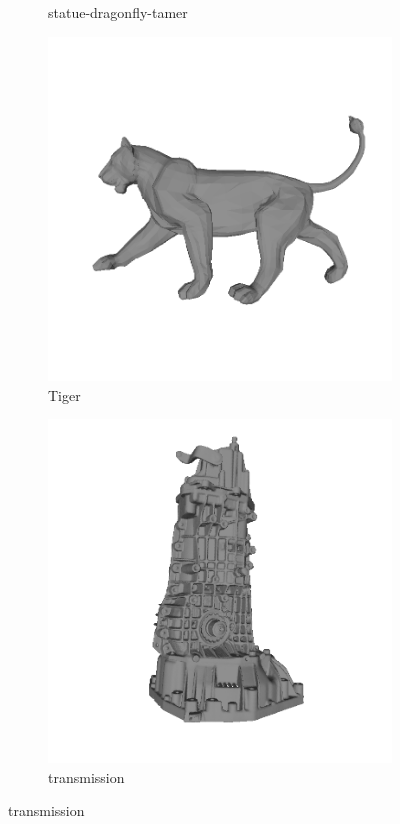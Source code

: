 \begin{figure}[!h]
\begin{subfigure}[b]{0.23\linewidth}
		\caption{statue-dragonfly-tamer}
	\end{subfigure}
	\begin{subfigure}[b]{0.23\linewidth}
		\includegraphics[width=\linewidth]{./Figures/train-dataset/38.tiger.png}
		\caption{Tiger}
	\end{subfigure}
	\begin{subfigure}[b]{0.23\linewidth}
		\includegraphics[width=\linewidth]{./Figures/train-dataset/39.transmission.png}
		\caption{transmission}
	\end{subfigure}


\end{figure}
